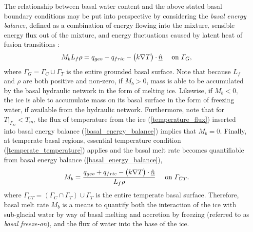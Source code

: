 The relationship between basal water content and the above stated basal boundary conditions may be put into perspective by considering the  \emph{basal energy balance}, defined as a combination of energy flowing into the mixture, sensible energy flux out of the mixture, and energy fluctuations caused by latent heat of fusion transitions \citep[][section 9.3.4]{greve_2009}:
\begin{align}
  \label{basal_energy_balance}
  M_b L_f \rho = q_{geo} + q_{fric} - \big( k \nabla T \big) \cdot \underline{\hat{n}} &&\text{ on } \varGamma_G,
\end{align}
where $\Gamma_G = \Gamma_C \cup \Gamma_T$ is the entire grounded basal surface.  Note that because $L_f$ and $\rho$ are both positive and non-zero, if $M_b > 0$, mass is able to be accumulated by the basal hydraulic network in the form of melting ice.  Likewise, if $M_b < 0$, the ice is able to accumulate mass on its basal surface in the form of freezing water, if available from the hydraulic network.  Furthermore, note that for $T |_{\Gamma_G} < T_m$, the flux of temperature from the ice (\ref{temperature_flux}) inserted into basal energy balance (\ref{basal_energy_balance}) implies that $M_b = 0$.  Finally, at temperate basal regions, essential temperature condition (\ref{temperate_temperature}) applies and the basal melt rate  becomes quantifiable from basal energy balance (\ref{basal_energy_balance}),
\begin{align}
  \label{basal_melt_rate}
  M_b = \frac{q_{geo} + q_{fric} - \big( k \nabla T \big) \cdot \underline{\hat{n}}}{L_f \rho} &&\text{ on } \varGamma_{CT}.
\end{align}
where $\Gamma_{CT} = \left( \Gamma_C \cap \Gamma_T \right) \cup \Gamma_T$ is the entire temperate basal surface.  Therefore, basal melt rate $M_b$ is a means to quantify both the interaction of the ice with sub-glacial water by way of basal melting and accretion by freezing (referred to as  \emph{basal freeze-on}), and the flux of water into the base of the ice.  

